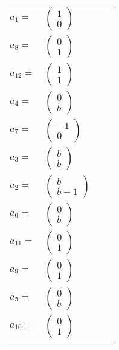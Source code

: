 \documentclass[1p]{elsarticle_modified}
\theoremstyle{definition}
\begin{document}
\begin{tabular}{m{7pt} m{180pt} m{7pt} m{180pt} }
\flushright $a_{1}=$&$\begin{pmatrix}1\\0\end{pmatrix}$ \\
\flushright $a_{8}=$&$\begin{pmatrix}0\\1\end{pmatrix}$ \\
\flushright $a_{12}=$&$\begin{pmatrix}1\\1\end{pmatrix}$ \\
\flushright $a_{4}=$&$\begin{pmatrix}0\\b\end{pmatrix}$ \\
\flushright $a_{7}=$&$\begin{pmatrix}-1\\0\end{pmatrix}$ \\
\flushright $a_{3}=$&$\begin{pmatrix}b\\b\end{pmatrix}$ \\
\flushright $a_{2}=$&$\begin{pmatrix}b\\b-1\end{pmatrix}$ \\
\flushright $a_{6}=$&$\begin{pmatrix}0\\b\end{pmatrix}$ \\
\flushright $a_{11}=$&$\begin{pmatrix}0\\1\end{pmatrix}$ \\
\flushright $a_{9}=$&$\begin{pmatrix}0\\1\end{pmatrix}$ \\
\flushright $a_{5}=$&$\begin{pmatrix}0\\b\end{pmatrix}$ \\
\flushright $a_{10}=$&$\begin{pmatrix}0\\1\end{pmatrix}$\\&\end{tabular}
\end{document}
